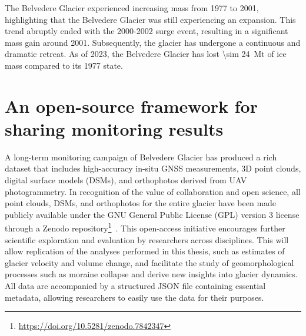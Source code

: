The Belvedere Glacier experienced increasing mass from 1977 to 2001, highlighting that the Belvedere Glacier was still experiencing an expansion. 
This trend abruptly ended with the 2000-2002 surge event, resulting in a significant mass gain around 2001. 
Subsequently, the glacier has undergone a continuous and dramatic retreat. 
As of 2023, the Belvedere Glacier has lost \SI{\sim 24}{\mega\tonne} of ice mass compared to its 1977 state.

\section{An open-source framework for sharing monitoring results}\label{sec:3:open-data}

A long-term monitoring campaign of Belvedere Glacier has produced a rich dataset that includes high-accuracy in-situ GNSS measurements, 3D point clouds, digital surface models (DSMs), and orthophotos derived from UAV photogrammetry.
In recognition of the value of collaboration and open science, all point clouds, DSMs, and orthophotos for the entire glacier have been made publicly available under the GNU General Public License (GPL) version 3 license through a Zenodo repository\footnote{\url{https://doi.org/10.5281/zenodo.7842347}}~\citep{ioli_2023_zenodo}.
This open-access initiative encourages further scientific exploration and evaluation by researchers across disciplines.
This will allow replication of the analyses performed in this thesis, such as estimates of glacier velocity and volume change, and facilitate the study of geomorphological processes such as moraine collapse and derive new insights into glacier dynamics. 
All data are accompanied by a structured JSON file containing essential metadata, allowing researchers to easily use the data for their purposes.


